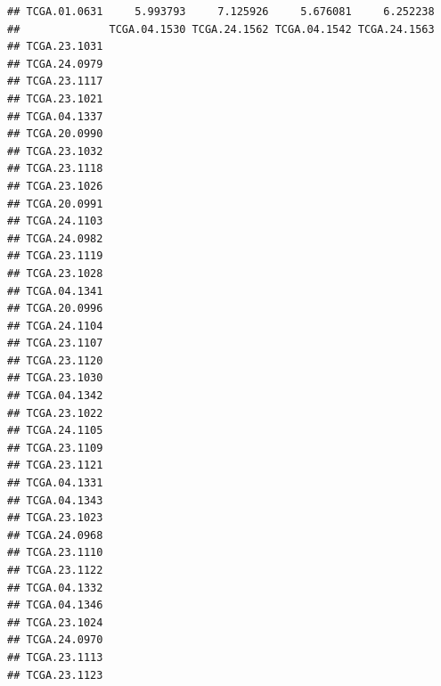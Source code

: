 \documentclass[UTF8]{beamer}\usepackage[]{graphicx}\usepackage[]{color}
\makeatletter
\newenvironment{kframe}{%
 \def\at@end@of@kframe{}%
 \ifinner\ifhmode%
  \def\at@end@of@kframe{\end{minipage}}%
  \begin{minipage}{\columnwidth}%
 \fi\fi%
 \def\FrameCommand##1{\hskip\@totalleftmargin \hskip-\fboxsep
 \colorbox{shadecolor}{##1}\hskip-\fboxsep
     \hskip-\linewidth \hskip-\@totalleftmargin \hskip\columnwidth}%
 \MakeFramed {\advance\hsize-\width
   \@totalleftmargin\z@ \linewidth\hsize
   \@setminipage}}%
 {\par\unskip\endMakeFramed%
 \at@end@of@kframe}
\newenvironment{knitrout}{}{} %
\makeatother
\begin{document}
\begin{frame}[fragile]
\begin{knitrout}
\begin{kframe}
\begin{verbatim}
## TCGA.01.0631     5.993793     7.125926     5.676081     6.252238
##              TCGA.04.1530 TCGA.24.1562 TCGA.04.1542 TCGA.24.1563
## TCGA.23.1031                                                    
## TCGA.24.0979                                                    
## TCGA.23.1117                                                    
## TCGA.23.1021                                                    
## TCGA.04.1337                                                    
## TCGA.20.0990                                                    
## TCGA.23.1032                                                    
## TCGA.23.1118                                                    
## TCGA.23.1026                                                    
## TCGA.20.0991                                                    
## TCGA.24.1103                                                    
## TCGA.24.0982                                                    
## TCGA.23.1119                                                    
## TCGA.23.1028                                                    
## TCGA.04.1341                                                    
## TCGA.20.0996                                                    
## TCGA.24.1104                                                    
## TCGA.23.1107                                                    
## TCGA.23.1120                                                    
## TCGA.23.1030                                                    
## TCGA.04.1342                                                    
## TCGA.23.1022                                                    
## TCGA.24.1105                                                    
## TCGA.23.1109                                                    
## TCGA.23.1121                                                    
## TCGA.04.1331                                                    
## TCGA.04.1343                                                    
## TCGA.23.1023                                                    
## TCGA.24.0968                                                    
## TCGA.23.1110                                                    
## TCGA.23.1122                                                    
## TCGA.04.1332                                                    
## TCGA.04.1346                                                    
## TCGA.23.1024                                                    
## TCGA.24.0970                                                    
## TCGA.23.1113                                                    
## TCGA.23.1123                                                    

\end{verbatim}
\end{kframe}
\end{knitrout}
\end{frame}
\end{document}
